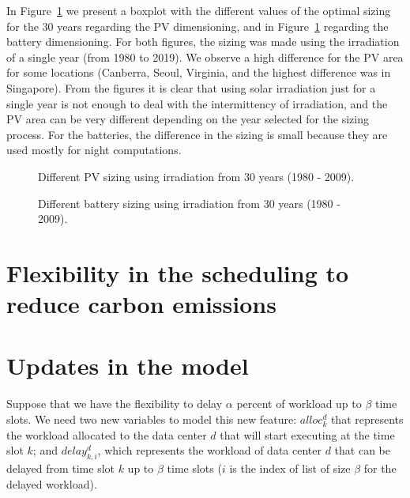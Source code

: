 In Figure~\ref{fig:pv_boxplots} we present a boxplot with the different values of the optimal sizing for the 30 years regarding the PV dimensioning, and in Figure~\ref{fig:pv_boxplots} regarding the battery dimensioning. For both figures, the sizing was made using the irradiation of a single year (from 1980 to 2019). We observe a high difference for the PV area for some locations (Canberra, Seoul, Virginia, and the highest difference was in Singapore). From the figures it is clear that using solar irradiation just for a single year is not enough to deal with the intermittency of irradiation, and the PV area can be very different depending on the year selected for the sizing process. For the batteries, the difference in the sizing is small because they are used mostly for night computations.


\begin{figure}[H]
  \centering
  {}
  \caption{Different PV sizing using irradiation from 30 years (1980 - 2009).}
  \label{fig:pv_boxplots}
\end{figure}


\begin{figure}[H]
  \centering
  {}
  \caption{Different battery sizing using irradiation from 30 years (1980 - 2009).}
  \label{fig:bat_boxplots}
\end{figure}



\section{Flexibility in the scheduling to reduce carbon emissions}

\section{Updates in the model}

Suppose that we have the flexibility to delay $\alpha$ percent of workload up to $\beta$ time slots. We need two new variables to model this new feature: $alloc^d_k$ that represents the workload allocated to the data center $d$ that will start executing at the time slot $k$; and $delay_{k,i}^d$, which represents the workload of data center $d$ that can be delayed from time slot $k$ up to $\beta$ time slots ($i$ is the index of list of size $\beta$ for the delayed workload).

